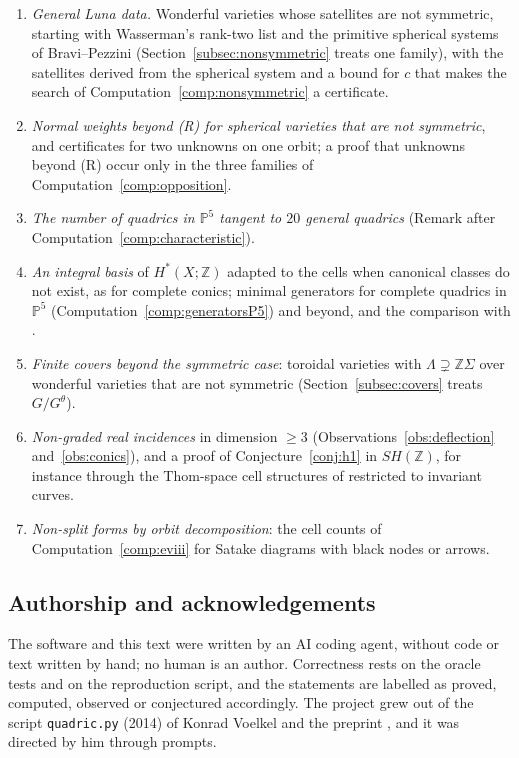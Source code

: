\documentclass[11pt]{amsart}
\theoremstyle{definition}
\theoremstyle{remark}
\newcommand{\code}[1]{\texttt{#1}}
\newcommand{\PP}{\mathbb{P}}
\newcommand{\ZZ}{\mathbb{Z}}
\begin{document}
\begin{enumerate}
\item \emph{General Luna data.} Wonderful varieties whose satellites are not
symmetric, starting with Wasserman's rank-two list \cite{Wasserman} and the
primitive spherical systems of Bravi--Pezzini \cite{BravPez,BravPezPrimitive}
(Section~\ref{subsec:nonsymmetric} treats one family), with the satellites
derived from the spherical system and a bound for $c$ that makes the search
of Computation~\ref{comp:nonsymmetric} a certificate.
\item \emph{Normal weights beyond (R) for spherical varieties that are not
symmetric}, and certificates for two unknowns on one orbit; a proof that
unknowns beyond (R) occur only in the three families of
Computation~\ref{comp:opposition}.
\item \emph{The number of quadrics in $\PP^5$ tangent to $20$ general quadrics}
(Remark after Computation~\ref{comp:characteristic}).
\item \emph{An integral basis} of $H^*(X;\ZZ)$ adapted to the cells when
canonical classes do not exist, as for complete conics; minimal generators
for complete quadrics in $\PP^5$ (Computation~\ref{comp:generatorsP5}) and
beyond, and the comparison with \cite{DGMP}.
\item \emph{Finite covers beyond the symmetric case}: toroidal varieties with
$\Lambda\supsetneq\ZZ\Sigma$ over wonderful varieties that are not symmetric
(Section~\ref{subsec:covers} treats $G/G^\theta$).
\item \emph{Non-graded real incidences} in dimension $\ge3$
(Observations~\ref{obs:deflection} and~\ref{obs:conics}), and a proof of
Conjecture~\ref{conj:h1} in $SH(\ZZ)$, for instance through the Thom-space cell
structures of \cite{VoelkelSpherical} restricted to invariant curves.
\item \emph{Non-split forms by orbit decomposition}: the cell counts of
Computation~\ref{comp:eviii} for Satake diagrams with black nodes or arrows.
\end{enumerate}

\subsection*{Authorship and acknowledgements}
The software and this text were written by an AI coding agent, without code
or text written by hand; no human is an author. Correctness rests on the
oracle tests and on the reproduction script, and the statements are labelled
as proved, computed, observed or conjectured accordingly. The project grew
out of the script \code{quadric.py} (2014) of Konrad Voelkel and the
preprint \cite{VoelkelSpherical}, and it was directed by him through
prompts.



\end{document}
